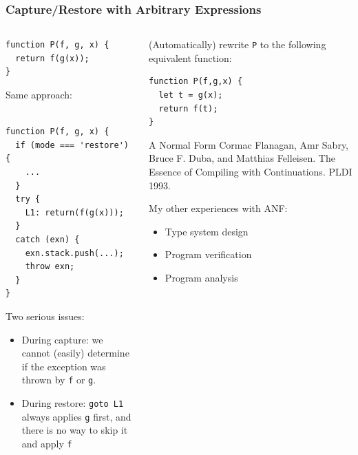 \documentclass[8pt,pdf,handout]{beamer}
\begin{document}
\begin{frame}[fragile]
\frametitle{Capture/Restore with Arbitrary Expressions}

\begin{columns}
\begin{column}{0.4\textwidth}

\begin{lstlisting}
function P(f, g, x) {
  return f(g(x));
}
\end{lstlisting}

Same approach:
\begin{lstlisting}

function P(f, g, x) {
  if (mode === 'restore') {
    ...
  }
  try {
    L1: return(f(g(x)));
  }
  catch (exn) {
    exn.stack.push(...);
    throw exn;
  }
}
\end{lstlisting}

\pause

Two serious issues:

\begin{itemize}
  \item During capture: we cannot (easily) determine if the exception was thrown
  by \lstinline|f| or \lstinline|g|.
  \item During restore: \lstinline|goto L1| always applies \lstinline|g| first,
  and there is no way to skip it and apply \lstinline|f|
\end{itemize}

\end{column}

\begin{column}{0.58\textwidth}
\pause

(Automatically) rewrite \lstinline|P| to the following equivalent
function:

\begin{lstlisting}
function P(f,g,x) {
  let t = g(x);
  return f(t);
}
\end{lstlisting}

\pause

\begin{alertblock}{A Normal Form}
Cormac Flanagan, Amr Sabry, Bruce F. Duba, and Matthias Felleisen.
The Essence of Compiling with Continuations. PLDI 1993.
\end{alertblock}

My other experiences with ANF:
\begin{itemize}

  \item Type system design
  \item Program verification
  \item Program analysis
\end{itemize}

\end{column}
\end{columns}

\end{frame}
\end{document}
